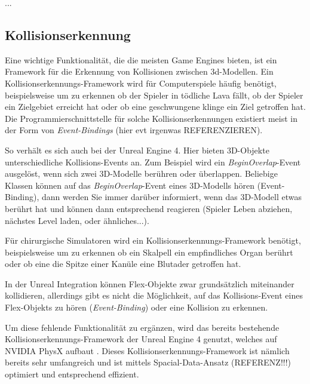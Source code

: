 ...

\subsection{Kollisionserkennung}


Eine wichtige Funktionalität, die die meisten Game Engines bieten, ist ein Framework für die Erkennung von Kollisionen zwischen 3d-Modellen. 
Ein Kollisionserkennungs-Framework wird für Computerspiele häufig benötigt, beispielsweise um zu erkennen ob der Spieler in tödliche Lava fällt, ob der Spieler ein Zielgebiet erreicht hat oder ob eine geschwungene klinge ein Ziel getroffen hat. Die Programmierschnittstelle für solche Kollisionserkennungen existiert meist in der Form von \textit{Event-Bindings} (hier evt irgenwas REFERENZIEREN). 

So verhält es sich auch bei der Unreal Engine 4. Hier bieten 3D-Objekte unterschiedliche Kollisions-Events an. Zum Beispiel wird ein \textit{BeginOverlap}-Event ausgelöst, wenn sich zwei 3D-Modelle berühren oder überlappen. Beliebige Klassen können auf das \textit{BeginOverlap}-Event eines 3D-Modells hören (Event-Binding), dann werden Sie immer darüber informiert, wenn das 3D-Modell etwas berührt hat und können dann entsprechend reagieren (Spieler Leben abziehen, nächstes Level laden, oder ähnliches...).

Für chirurgische Simulatoren wird ein Kollisionserkennungs-Framework benötigt, beispielsweise um zu erkennen ob ein Skalpell ein empfindliches Organ berührt oder ob eine die Spitze einer Kanüle eine Blutader getroffen hat.

In der Unreal Integration können Flex-Objekte zwar grundsätzlich miteinander kollidieren, allerdings gibt es nicht die Möglichkeit, auf das Kollisions-Event eines Flex-Objekts zu hören (\textit{Event-Binding}) oder eine Kollision zu erkennen.

Um diese fehlende Funktionalität zu ergänzen, wird das bereits bestehende Kollisionserkennungs-Framework der Unreal Engine 4 genutzt, welches auf NVIDIA PhysX aufbaut \cite{ue4physics}. Dieses Kollisionserkennungs-Framework ist nämlich bereits sehr umfangreich und ist mittels Spacial-Data-Ansatz (REFERENZ!!!) optimiert und entsprechend effizient.


